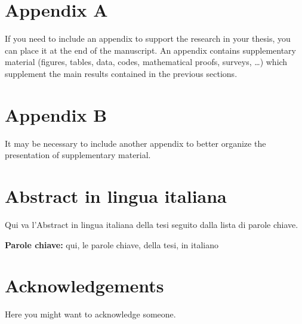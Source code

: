 \documentclass[11pt,a4paper]{article}
\begin{document}


\appendix
\section{Appendix A}
If you need to include an appendix to support the research in your thesis, you can place it at the end of the manuscript.
An appendix contains supplementary material (figures, tables, data, codes, mathematical proofs, surveys, \dots)
which supplement the main results contained in the previous sections.

\section{Appendix B}
It may be necessary to include another appendix to better organize the presentation of supplementary material.

\cleardoublepage

\section*{Abstract in lingua italiana}
Qui va l'Abstract in lingua italiana della tesi seguito dalla lista di parole chiave.
\vspace{15pt}
\begin{tcolorbox}[arc=0pt, boxrule=0pt, colback=bluePoli!60, width=\textwidth, colupper=white]
	\textbf{Parole chiave:} qui, le parole chiave, della tesi, in italiano
\end{tcolorbox}

\section*{Acknowledgements}
Here you might want to acknowledge someone.

\end{document}
